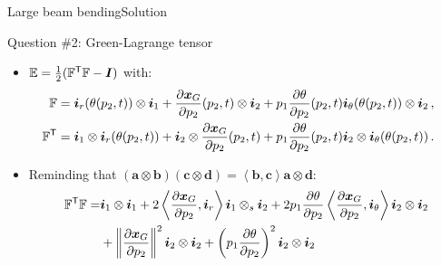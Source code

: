 \documentclass{beamer}
\newcommand{\demi}{\frac{1}{2}}
\newcommand{\itr}{{\sf T}}
\newcommand{\Id}{{\boldsymbol I}}
\newcommand{\aj}{a}
\newcommand{\bj}{b}
\newcommand{\cj}{c}
\renewcommand{\dj}{d}
\newcommand{\av}{{\boldsymbol\aj}}
\newcommand{\bv}{{\boldsymbol\bj}}
\newcommand{\cv}{{\boldsymbol\cj}}
\newcommand{\dv}{{\boldsymbol\dj}}
\newcommand{\xj}{x}
\newcommand{\xv}{{\boldsymbol\xj}}
\renewcommand{\ij}{i}
\newcommand{\pj}{p}
\newcommand{\iv}{{\boldsymbol\ij}}
\newcommand{\Fp}{{\mathbb F}}
\newcommand{\GreenLj}{E}
\newcommand{\GreenL}{{\mathbb\GreenLj}}
\newcommand{\scal}[1]{\left\langle{#1}\right\rangle}
\newcommand{\norm}[1]{\left\|#1\right\|}
\begin{document}
\begin{frame}{Large beam bending}{Solution}
\begin{overprint}
\vskip-20pt
\begin{exampleblock}{Question \#2: Green-Lagrange tensor}
\begin{itemize}
\item $\GreenL=\demi(\Fp^\itr\Fp-\Id)$ with:
\vskip-10pt
{\scriptsize
\begin{displaymath}
\begin{split}
\!\!\!\!\!\!\!\!\Fp &=\iv_r(\theta(\pj_2,t))\otimes\iv_1+\frac{\partial\xv_G}{\partial\pj_2}(\pj_2,t)\otimes\iv_2+\pj_1\frac{\partial\theta}{\partial\pj_2}(\pj_2,t)\iv_\theta(\theta(\pj_2,t))\otimes\iv_2\,, \\
\!\!\!\!\!\!\!\!\Fp^\itr &=\iv_1\otimes\iv_r(\theta(\pj_2,t))+\iv_2\otimes\frac{\partial\xv_G}{\partial\pj_2}(\pj_2,t)+\pj_1\frac{\partial\theta}{\partial\pj_2}(\pj_2,t)\iv_2\otimes\iv_\theta(\theta(\pj_2,t))\,.
\end{split}
\end{displaymath}}
\item Reminding that $(\av\otimes\bv)(\cv\otimes\dv)=\scal{\bv,\cv}\av\otimes\dv$:
{\scriptsize
\begin{displaymath}
\begin{split}
\Fp^\itr\Fp= &\iv_1\otimes\iv_1+2\scal{\frac{\partial\xv_G}{\partial\pj_2},\iv_r}\iv_1\otimes_s\iv_2+2\pj_1\frac{\partial\theta}{\partial\pj_2}\scal{\frac{\partial\xv_G}{\partial\pj_2},\iv_\theta}\iv_2\otimes\iv_2 \\
&+\norm{\frac{\partial\xv_G}{\partial\pj_2}}^2\iv_2\otimes\iv_2+\left(\pj_1\frac{\partial\theta}{\partial\pj_2}\right)^2\iv_2\otimes\iv_2
\end{split}
\end{displaymath}}
\end{itemize}
\end{exampleblock}


\end{overprint}
\end{frame}
\end{document}
